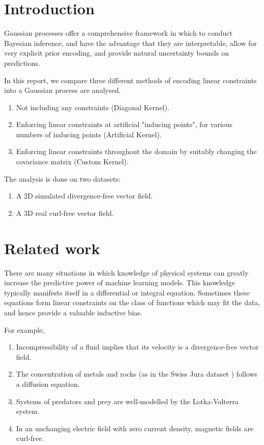 \documentclass[12pt,a4paper,twoside]{report}
\theoremstyle{definition}
\begin{document}
\listoffigures
{}

\chapter{Introduction}
\label{firstcontentpage}
Gaussian processes offer a comprehensive framework in which to conduct Bayesian inference, and have the advantage that they are interpretable, allow for very explicit prior encoding, and provide natural uncertainty bounds on predictions.

In this report, we compare three different methods of encoding linear constraints into a Gaussian process are analysed.

\begin{enumerate}
	\item Not including any constraints (Diagonal Kernel).
	\item Enforcing linear constraints at artificial "inducing points", for various numbers of inducing points (Artificial Kernel).
	\item Enforcing linear constraints throughout the domain by suitably changing the covariance matrix (Custom Kernel).
\end{enumerate}

The analysis is done on two datasets:
\begin{enumerate}
	\item A 2D simulated divergence-free vector field.
	\item A 3D real curl-free vector field.
\end{enumerate}

\chapter{Related work}
There are many situations in which knowledge of physical systems can greatly increase the predictive power of machine learning models. This knowledge typically manifests itself in a differential or integral equation. Sometimes these equations form linear constraints on the class of functions which may fit the data, and hence provide a valuable inductive bias.

For example,
\begin{enumerate}
	\item Incompressibility of a fluid implies that its velocity is a divergence-free vector field. 
	\item The concentration of metals and rocks (as in the Swiss Jura dataset \cite{Swan}) follows a diffusion equation. 
	\item Systems of predators and prey are well-modelled by the Lotka-Volterra system. 
	\item In an unchanging electric field with zero current density, magnetic fields are curl-free.
\end{enumerate}
\end{document}
